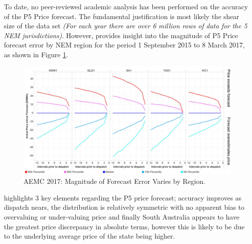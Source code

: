 To date, no peer-reviewed academic analysis has been performed on the accuracy of the P5 Price forecast. The fundamental justification is most likely the shear size of the data set \textit{(For each year there are over 6 million rows of data for the 5 NEM jurisdictions)}. However, \parencite{AEMCMarch2017} provides insight into the magnitude of P5 Price forecast error by NEM region for the period 1 September 2015 to 8 March 2017, as shown in Figure \ref{fig:p5_aemc}. 
\begin{figure}[!htb]
\centering
\includegraphics[width=1\textwidth]{Pictures/Chapter2/AEMC_P5_Error.PNG}
\caption{AEMC 2017: Magnitude of Forecast Error Varies by Region.}
\label{fig:p5_aemc}
\end{figure}
\parencite{AEMCMarch2017} highlights 3 key elements regarding the P5 price forecast; accuracy improves as dispatch nears, the distribution is relatively symmetric with no apparent bias to overvaluing or under-valuing price and finally South Australia appears to have the greatest price discrepancy in absolute terms, however this is likely to be due to the underlying average price of the state being higher.


